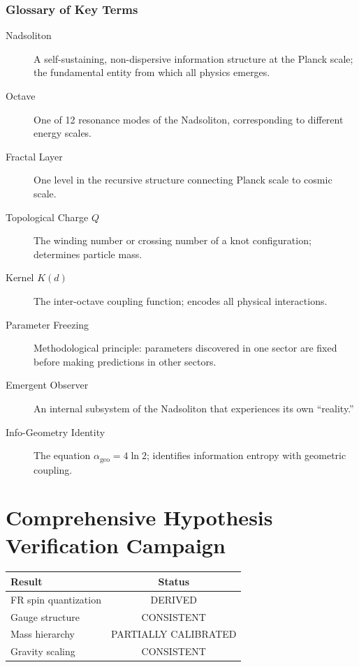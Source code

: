 \documentclass[11pt,a4paper]{book}
\theoremstyle{remark}
\newcommand{\alphageo}{\alpha_{\text{geo}}}
\begin{document}
\section{Glossary of Key Terms}

\begin{description}
    \item[Nadsoliton] A self-sustaining, non-dispersive information structure at the Planck scale; the fundamental entity from which all physics emerges.
    
    \item[Octave] One of 12 resonance modes of the Nadsoliton, corresponding to different energy scales.
    
    \item[Fractal Layer] One level in the recursive structure connecting Planck scale to cosmic scale.
    
    \item[Topological Charge $Q$] The winding number or crossing number of a knot configuration; determines particle mass.
    
    \item[Kernel $K(d)$] The inter-octave coupling function; encodes all physical interactions.
    
    \item[Parameter Freezing] Methodological principle: parameters discovered in one sector are fixed before making predictions in other sectors.
    
    \item[Emergent Observer] An internal subsystem of the Nadsoliton that experiences its own ``reality.''
    
    \item[Info-Geometry Identity] The equation $\alphageo = 4\ln 2$; identifies information entropy with geometric coupling.
\end{description}

\part{Comprehensive Hypothesis Verification Campaign}

\begin{center}
\begin{tabular}{|l|c|}
\hline
Result & Status \\
\hline
FR spin quantization & DERIVED \\
Gauge structure & CONSISTENT \\
Mass hierarchy & PARTIALLY CALIBRATED \\
Gravity scaling & CONSISTENT \\
\hline
\end{tabular}
\end{center}
\end{document}

